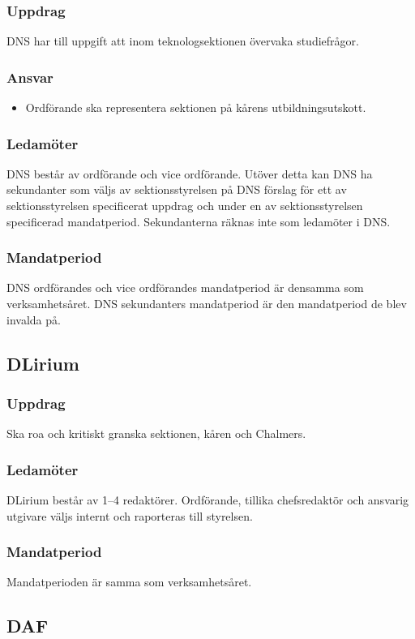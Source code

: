 \subsubsection{Uppdrag}
DNS har till uppgift att inom teknologsektionen övervaka studiefrågor.
\subsubsection{Ansvar}
\begin{itemize}
  \item Ordförande ska representera sektionen på kårens utbildningsutskott.
\end{itemize}
\subsubsection{Ledamöter}
DNS består av ordförande och vice ordförande. Utöver detta kan DNS ha sekundanter som väljs av sektionsstyrelsen på DNS förslag för ett av sektionsstyrelsen specificerat uppdrag och under en av sektionsstyrelsen specificerad mandatperiod. Sekundanterna räknas inte som ledamöter i DNS.
\subsubsection{Mandatperiod}
DNS ordförandes och vice ordförandes mandatperiod är densamma som verksamhetsåret. DNS sekundanters mandatperiod är den mandatperiod de blev invalda på.

\subsection{DLirium}
\subsubsection{Uppdrag}
Ska roa och kritiskt granska sektionen, kåren och Chalmers. 
\subsubsection{Ledamöter}
DLirium består av 1--4 redaktörer. Ordförande, tillika chefsredaktör och ansvarig utgivare väljs internt och raporteras till styrelsen.
\subsubsection{Mandatperiod}
Mandatperioden är samma som verksamhetsåret. 

\subsection{DAF}
